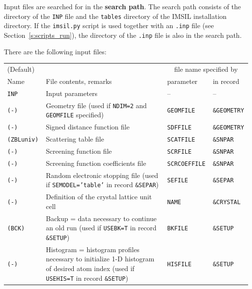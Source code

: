 Input files are searched for in the \textbf{search path}. The search path 
consists of the directory of the \texttt{INP} file and the \texttt{tables} 
directory of the IMSIL installation directory. If the \texttt{imsil.py}
script is used together with an \texttt{.inp} file 
(see Section~\ref{s:scripts_run}), the directory of the \texttt{.inp} file 
is also in the search path. 

There are the following input files:
\bigskip
%
\begin{center}
\begin{tabular}{|l|p{}|l|l|}
\hline
(Default) &                   & \multicolumn{2}{c|}{file name specified by} \\
Name      & File contents, remarks     & parameter  & in record \\
\hline
\tt INP         & Input parameters                         & --           & -- \\
\tt (-)         & \raggedright Geometry file (used if \texttt{NDIM=2} and
\texttt{GEOMFILE} specified) & \texttt{GEOMFILE} & \tt \&GEOMETRY \\ 
\tt (-)         & Signed distance function file            & \tt SDFFILE  & \tt \&GEOMETRY \\
\tt (ZBLuniv)   & \raggedright Scattering table file       & \tt SCATFILE & \tt \&SNPAR \\
\tt (-)         & \raggedright Screening function file     & \tt SCRFILE  & \tt \&SNPAR \\
\tt (-)         & \raggedright Screening function coefficients file  
                                                           & \tt SCRCOEFFILE & \tt \&SNPAR \\
\tt (-)         & Random electronic stopping file (used if \texttt{SEMODEL='table'} in
                  record \texttt{\&SEPAR})                 & \tt SEFILE   & \tt \&SEPAR \\
\tt (-)         & Definition of the crystal lattice unit cell  
                                                           & \tt NAME     & \tt \&CRYSTAL \\
\tt (BCK)       & Backup = data necessary to continue an old run (used if \texttt{USEBK=T} in 
                  record \texttt{\&SETUP})                 & \tt BKFILE   & \tt \&SETUP \\
\tt (-)         & Histogram = histogram profiles necessary to initialize 1-D
                  histogram of desired atom index (used if \texttt{USEHIS=T} in
                  record \texttt{\&SETUP})                 & \tt HISFILE  & \tt \&SETUP \\

\end{tabular}
\end{center}
